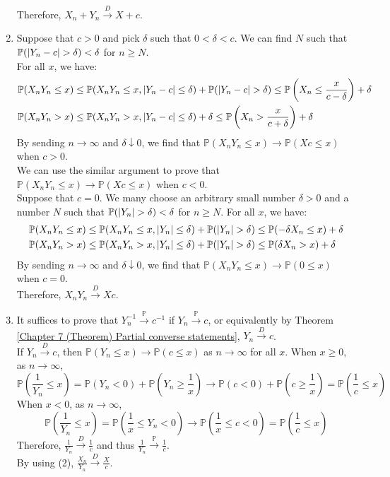 \documentclass{huhtakm-template-book}
\newcommand{\prob}{\mathbb{P}}
\begin{document}
\begin{proofing}
\begin{enumerate}
		Therefore, $X_{n}+Y_{n}\xrightarrow{D}X+c$.
		\item Suppose that $c>0$ and pick $\delta$ such that $0<\delta<c$. We can find $N$ such that $\prob(\abs{Y_{n}-c}>\delta)<\delta$ for $n\geq N$.\\
		For all $x$, we have:
		\begin{align*}
			\prob(X_{n}Y_{n}\leq x)&\leq\prob(X_{n}Y_{n}\leq x,\abs{Y_{n}-c}\leq\delta)+\prob(\abs{Y_{n}-c}>\delta)\leq\prob\left(X_{n}\leq \frac{x}{c-\delta}\right)+\delta\\
			\prob(X_{n}Y_{n}>x)&\leq\prob(X_{n}Y_{n}>x,\abs{Y_{n}-c}\leq\delta)+\delta\leq\prob\left(X_{n}>\frac{x}{c+\delta}\right)+\delta
		\end{align*}
		By sending $n\to\infty$ and $\delta\downarrow 0$, we find that $\prob(X_{n}Y_{n}\leq x)\to\prob(Xc\leq x)$ when $c>0$.\\
		We can use the similar argument to prove that $\prob(X_{n}Y_{n}\leq x)\to\prob(Xc\leq x)$ when $c<0$.\\
		Suppose that $c=0$. We many choose an arbitrary small number $\delta>0$ and a number $N$ such that $\prob(\abs{Y_{n}}>\delta)<\delta$ for $n\geq N$. For all $x$, we have:
		\begin{align*}
			\prob(X_{n}Y_{n}\leq x)&\leq\prob(X_{n}Y_{n}\leq x,\abs{Y_{n}}\leq\delta)+\prob(\abs{Y_{n}}>\delta)\leq\prob(-\delta X_{n}\leq x)+\delta\\
			\prob(X_{n}Y_{n}> x)&\leq\prob(X_{n}Y_{n}>x,\abs{Y_{n}}\leq\delta)+\prob(\abs{Y_{n}}>\delta)\leq\prob(\delta X_{n}>x)+\delta
		\end{align*}
		By sending $n\to\infty$ and $\delta\downarrow 0$, we find that $\prob(X_{n}Y_{n}\leq x)\to\prob(0\leq x)$ when $c=0$.\\
		Therefore, $X_{n}Y_{n}\xrightarrow{D}Xc$.
		\item It suffices to prove that $Y_{n}^{-1}\xrightarrow{\prob}c^{-1}$ if $Y_{n}\xrightarrow{\prob}c$, or equivalently by Theorem \ref{Chapter 7 (Theorem) Partial converse statements}, $Y_{n}\xrightarrow{D}c$.\\
		If $Y_{n}\xrightarrow{D}c$, then $\prob(Y_{n}\leq x)\to\prob(c\leq x)$ as $n\to\infty$ for all $x$. When $x\geq 0$, as $n\to\infty$,
		\begin{equation*}
			\prob\left(\frac{1}{Y_{n}}\leq x\right)=\prob(Y_{n}<0)+\prob\left(Y_{n}\geq\frac{1}{x}\right)\to\prob(c<0)+\prob\left(c\geq\frac{1}{x}\right)=\prob\left(\frac{1}{c}\leq x\right)
		\end{equation*}
		When $x<0$, as $n\to\infty$,
		\begin{equation*}
			\prob\left(\frac{1}{Y_{n}}\leq x\right)=\prob\left(\frac{1}{x}\leq Y_{n}<0\right)\to\prob\left(\frac{1}{x}\leq c<0\right)=\prob\left(\frac{1}{c}\leq x\right)
		\end{equation*}
		Therefore, $\frac{1}{Y_{n}}\xrightarrow{D}\frac{1}{c}$ and thus $\frac{1}{Y_{n}}\xrightarrow{\prob}\frac{1}{c}$.\\
		By using (2), $\frac{X_{n}}{Y_{n}}\xrightarrow{D}\frac{X}{c}$. \end{enumerate}
\end{proofing}
\end{document}
